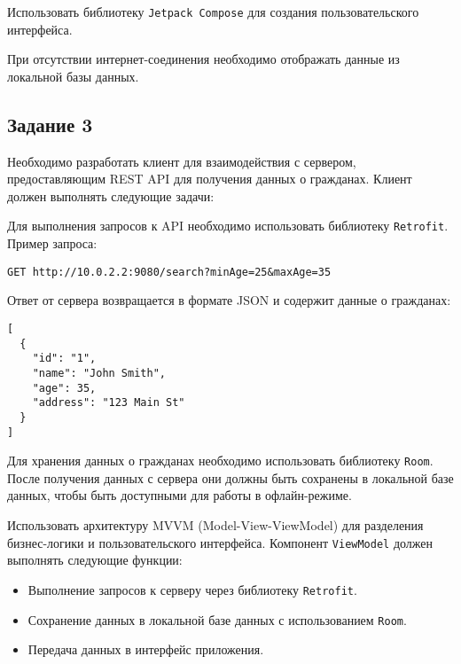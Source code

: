 \documentclass[a4paper,12pt]{article}
\begin{document}
Использовать библиотеку \texttt{Jetpack Compose} для создания пользовательского интерфейса.

При отсутствии интернет-соединения необходимо отображать данные из локальной базы данных.

\subsection*{Задание 3}

Необходимо разработать клиент для взаимодействия с сервером, предоставляющим REST API для получения данных о гражданах. Клиент должен выполнять следующие задачи:


Для выполнения запросов к API необходимо использовать библиотеку \texttt{Retrofit}. Пример запроса:

\begin{verbatim}
GET http://10.0.2.2:9080/search?minAge=25&maxAge=35
\end{verbatim}

Ответ от сервера возвращается в формате JSON и содержит данные о гражданах:

\begin{verbatim}
[
  {
    "id": "1",
    "name": "John Smith",
    "age": 35,
    "address": "123 Main St"
  }
]
\end{verbatim}

Для хранения данных о гражданах необходимо использовать библиотеку \texttt{Room}. После получения данных с сервера они должны быть сохранены в локальной базе данных, чтобы быть доступными для работы в офлайн-режиме.

Использовать архитектуру MVVM (Model-View-ViewModel) для разделения бизнес-логики и пользовательского интерфейса. Компонент \texttt{ViewModel} должен выполнять следующие функции:
\begin{itemize}
    \item Выполнение запросов к серверу через библиотеку \texttt{Retrofit}.
    \item Сохранение данных в локальной базе данных с использованием \texttt{Room}.
    \item Передача данных в интерфейс приложения.
\end{itemize}
\end{document}
